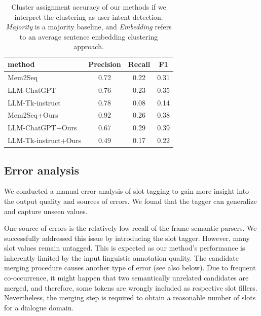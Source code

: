 \begin{table}[tp]
    \centering
    \small
    \begin{tabular}{lccc}
    \hline
     \textbf{method} & \textbf{Precision} & \textbf{Recall} & \textbf{F1} \\
     \hline
     Mem2Seq & 0.72 & 0.22 & 0.31 \\
     LLM-ChatGPT & 0.76 & 0.23 & 0.35 \\
     LLM-Tk-instruct & 0.78 & 0.08 & 0.14 \\
     Mem2Seq+Ours & 0.92 & 0.26 & 0.38 \\
     LLM-ChatGPT+Ours & 0.67 & 0.29 & 0.39 \\
     LLM-Tk-instruct+Ours & 0.49 & 0.17 & 0.22 \\
     
     \hline
    \end{tabular}
    
    \caption{Cluster assignment accuracy of our methods if we interpret the clustering as user intent detection. \textit{Majority} is a majority baseline, and \textit{Embedding} refers to an average sentence embedding clustering approach.
    }
    \label{04:tab:unsup-discovery}
\end{table}


\subsection{Error analysis}
We conducted a manual error analysis of slot tagging to gain more insight into the output quality and sources of errors.
We found that the tagger can generalize and capture unseen values.

One source of errors is the relatively low recall of the frame-semantic parsers.
We successfully addressed this issue by introducing the slot tagger.
However, many slot values remain untagged.
This is expected as our method's performance is inherently limited by the input linguistic annotation quality.
The candidate merging procedure causes another type of error (see also below).
Due to frequent co-occurrence, it might happen that two semantically unrelated candidates are merged, and therefore, some tokens are wrongly included as respective slot fillers.
Nevertheless, the merging step is required to obtain a reasonable number of slots for a dialogue domain.

